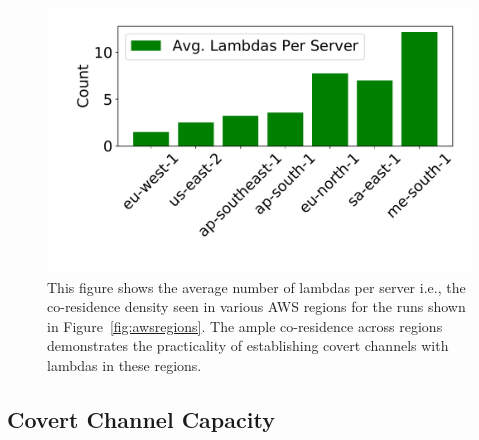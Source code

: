 
\begin{figure}[!t]
  \includegraphics[width=.99\linewidth]{fig/density.pdf}
  \caption{This figure shows the average number of lambdas per server i.e., the co-residence 
  density seen in various AWS regions for the runs shown in Figure~\ref{fig:awsregions}. 
  The ample co-residence across regions demonstrates the practicality of establishing 
  covert channels with lambdas in these regions.
\label{fig:density}}
\end{figure}


\subsection{Covert Channel Capacity}
\todo{}
